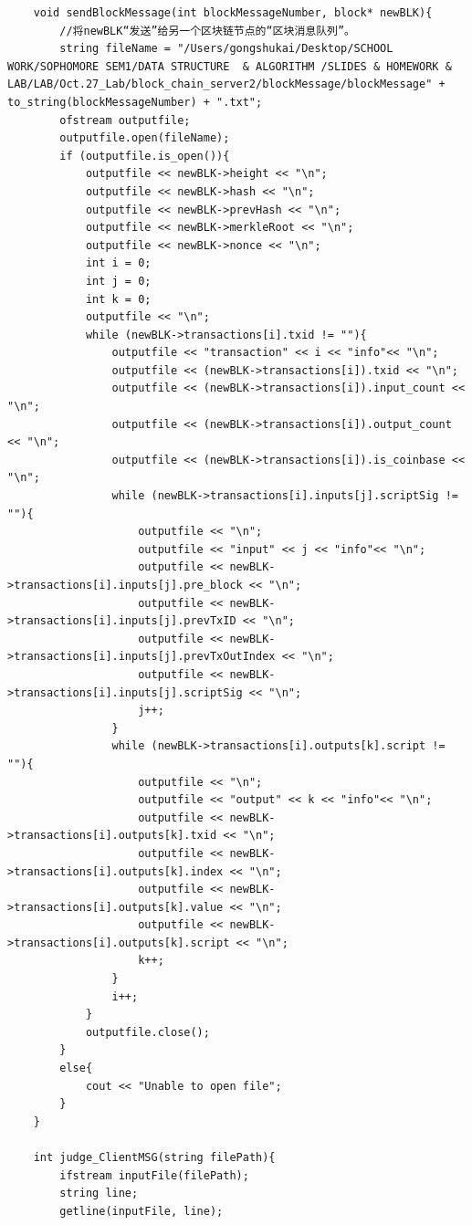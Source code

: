 \documentclass[10pt,a4paper]{article}
\begin{document}
\begin{verbatim}
    void sendBlockMessage(int blockMessageNumber, block* newBLK){
        //将newBLK“发送”给另一个区块链节点的“区块消息队列”。
        string fileName = "/Users/gongshukai/Desktop/SCHOOL WORK/SOPHOMORE SEM1/DATA STRUCTURE  & ALGORITHM /SLIDES & HOMEWORK & LAB/LAB/Oct.27_Lab/block_chain_server2/blockMessage/blockMessage" + to_string(blockMessageNumber) + ".txt";
        ofstream outputfile;
        outputfile.open(fileName);
        if (outputfile.is_open()){
            outputfile << newBLK->height << "\n";
            outputfile << newBLK->hash << "\n";
            outputfile << newBLK->prevHash << "\n";
            outputfile << newBLK->merkleRoot << "\n";
            outputfile << newBLK->nonce << "\n";
            int i = 0;
            int j = 0;
            int k = 0;
            outputfile << "\n";
            while (newBLK->transactions[i].txid != ""){
                outputfile << "transaction" << i << "info"<< "\n";
                outputfile << (newBLK->transactions[i]).txid << "\n";
                outputfile << (newBLK->transactions[i]).input_count << "\n";
                outputfile << (newBLK->transactions[i]).output_count << "\n";
                outputfile << (newBLK->transactions[i]).is_coinbase << "\n";
                while (newBLK->transactions[i].inputs[j].scriptSig != ""){
                    outputfile << "\n";
                    outputfile << "input" << j << "info"<< "\n";
                    outputfile << newBLK->transactions[i].inputs[j].pre_block << "\n";
                    outputfile << newBLK->transactions[i].inputs[j].prevTxID << "\n";
                    outputfile << newBLK->transactions[i].inputs[j].prevTxOutIndex << "\n";
                    outputfile << newBLK->transactions[i].inputs[j].scriptSig << "\n";
                    j++;
                }
                while (newBLK->transactions[i].outputs[k].script != ""){
                    outputfile << "\n";
                    outputfile << "output" << k << "info"<< "\n";
                    outputfile << newBLK->transactions[i].outputs[k].txid << "\n";
                    outputfile << newBLK->transactions[i].outputs[k].index << "\n";
                    outputfile << newBLK->transactions[i].outputs[k].value << "\n";
                    outputfile << newBLK->transactions[i].outputs[k].script << "\n";
                    k++;
                }
                i++;
            }
            outputfile.close();
        }
        else{
            cout << "Unable to open file";
        }
    }
    
    int judge_ClientMSG(string filePath){
        ifstream inputFile(filePath);
        string line;
        getline(inputFile, line);
    

\end{verbatim}
\end{document}
